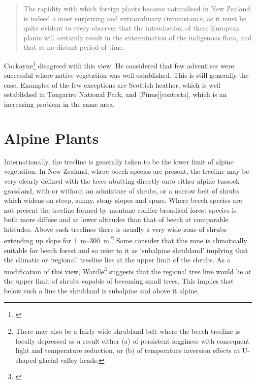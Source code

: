 \begin{quote}
	The rapidity with which foreign plants become naturalised in New Zealand is indeed a most surprising and extraordinary circumstance, as it must be quite evident to every observer that the introduction of these European plants will certainly result in the extermination of the indigenous flora, and that at no distant period of time.
\end{quote}

Cockayne\footnote{\cite{cockayne1967plants}} disagreed with this view.
He considered that few adventives were successful where native vegetation was well established.
This is still generally the case.
Examples of the few exceptions are Scottish heather, which is well established in Tongariro National Park, and [Pinus][contorta], which is an increasing problem in the same area.

\chapter{Alpine Plants}

Internationally, the treeline is generally taken to be the lower limit of alpine vegetation.
In New Zealand, where beech species are present, the treeline may be very clearly defined with the trees abutting directly onto either alpine tussock grassland, with or without an admixture of shrubs, or a narrow belt of shrubs which widens on steep, sunny, stony slopes and spurs.
Where beech species are not present the treeline formed by montane conifer broadleaf forest species is both more diffuse and at lower altitudes than that of beech at comparable latitudes.
Above such treelines there is usually a very wide zone of shrubs extending up slope for \SIrange{1}{300}{\metre}.\footnote{There may also be a fairly wide shrubland belt where the beech treeline is locally depressed as a result either (a) of persistent fogginess with consequent light and temperature reduction, or (b) of temperature inversion effects at U-shaped glacial valley heads.}
Some consider that this zone is climatically suitable for beech forest and so refer to it as `subalpine shrubland' implying that the climatic or `regional' treeline lies at the upper limit of the shrubs.
As a modification of this view, Wardle\footnote{\cite{wardle1965comparison}} suggests that the regional tree line would lie at the upper limit of shrubs capable of becoming small trees.
This implies that below such a line the shrubland is subalpine and above it alpine.


